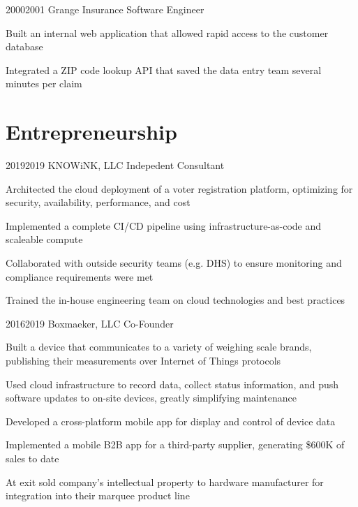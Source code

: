 \documentclass{article}
\begin{document}
\job
  {2000}{2001}
  {Grange Insurance}
  {Software Engineer}
  {\begin{achievements}
    \item Built an internal web application that allowed rapid access to the customer database
    \item Integrated a ZIP code lookup API that saved the data entry team several minutes per claim
  \end{achievements}}

\pagebreak

\section{Entrepreneurship}

\job
  {2019}{2019}
  {KNOWiNK, LLC}
  {Indepedent Consultant}
  {\begin{achievements}
    \item Architected the cloud deployment of a voter registration platform, optimizing for security, availability, performance, and cost
    \item Implemented a complete CI/CD pipeline using infrastructure-as-code and scaleable compute
    \item Collaborated with outside security teams (e.g. DHS) to ensure monitoring and compliance requirements were met
    \item Trained the in-house engineering team on cloud technologies and best practices
  \end{achievements}}

\job
  {2016}{2019}
  {Boxmaeker, LLC}
  {Co-Founder}
  {\begin{achievements}
    \item Built a device that communicates to a variety of weighing scale brands, publishing their measurements over Internet of Things protocols
    \item Used cloud infrastructure to record data, collect status information, and push software updates to on-site devices, greatly simplifying maintenance
    \item Developed a cross-platform mobile app for display and control of device data
    \item Implemented a mobile B2B app for a third-party supplier, generating \$600K of sales to date
    \item At exit sold company's intellectual property to hardware manufacturer for integration into their marquee product line
  \end{achievements}}
\end{document}
